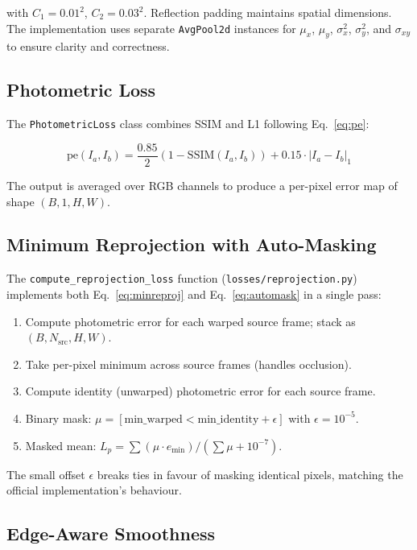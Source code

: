 \documentclass[10pt, a4paper, twocolumn]{article}
\begin{document}
with $C_1 = 0.01^2$, $C_2 = 0.03^2$. Reflection padding maintains spatial dimensions. The implementation uses separate \texttt{AvgPool2d} instances for $\mu_x$, $\mu_y$, $\sigma_x^2$, $\sigma_y^2$, and $\sigma_{xy}$ to ensure clarity and correctness.

\subsection{Photometric Loss}

The \texttt{PhotometricLoss} class combines SSIM and L1 following Eq.~\ref{eq:pe}:

\begin{equation}
\text{pe}(I_a, I_b) = \frac{0.85}{2}(1 - \text{SSIM}(I_a, I_b)) + 0.15 \cdot |I_a - I_b|_1
\end{equation}

The output is averaged over RGB channels to produce a per-pixel error map of shape $(B, 1, H, W)$.

\subsection{Minimum Reprojection with Auto-Masking}

The \texttt{compute\_reprojection\_loss} function (\texttt{losses/reprojection.py}) implements both Eq.~\ref{eq:minreproj} and Eq.~\ref{eq:automask} in a single pass:

\begin{enumerate}[noitemsep]
    \item Compute photometric error for each warped source frame; stack as $(B, N_{\text{src}}, H, W)$.
    \item Take per-pixel minimum across source frames (handles occlusion).
    \item Compute identity (unwarped) photometric error for each source frame.
    \item Binary mask: $\mu = [\text{min\_warped} < \text{min\_identity} + \epsilon]$ with $\epsilon = 10^{-5}$.
    \item Masked mean: $L_p = \sum(\mu \cdot e_{\min}) / (\sum\mu + 10^{-7})$.
\end{enumerate}

The small offset $\epsilon$ breaks ties in favour of masking identical pixels, matching the official implementation's behaviour.

\subsection{Edge-Aware Smoothness}
\end{document}
